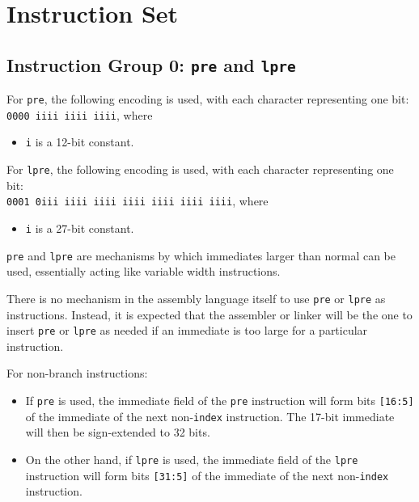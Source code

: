 \documentclass{article}
\begin{document}
	\newpage
	\section{Instruction Set}

	\subsection{Instruction Group 0: \texttt{pre} and \texttt{lpre}}
	For \texttt{pre}, the following encoding is used, with each character
	representing one bit: \\
	\texttt{0000 iiii iiii iiii}, where 
	
	\singlespacing
	\begin{itemize}
		\item \texttt{i} is a 12-bit constant.
	\end{itemize}

	For \texttt{lpre}, the following encoding is used, with each character
	representing one bit: \\
	\texttt{0001 0iii iiii iiii  iiii iiii iiii iiii}, where

	\singlespacing
	\begin{itemize}
		\item \texttt{i} is a 27-bit constant.
	\end{itemize}

	\texttt{pre} and \texttt{lpre} are mechanisms by which immediates
	larger than normal can be used, essentially acting like variable width
	instructions.

	There is no mechanism in the assembly language itself to use
	\texttt{pre} or \texttt{lpre} as instructions. Instead, it is expected
	that the assembler or linker will be the one to insert \texttt{pre} or
	\texttt{lpre} as needed if an immediate is too large for a particular
	instruction.

	For non-branch instructions:
	\begin{itemize}
		\item If \texttt{pre} is used, the immediate field of the
		\texttt{pre} instruction will form bits \texttt{[16:5]} of the
		immediate of the next non-\texttt{index} instruction. The 17-bit
		immediate will then be sign-extended to 32 bits.

		\item On the other hand, if \texttt{lpre} is used, the immediate
		field of the \texttt{lpre} instruction will form bits
		\texttt{[31:5]} of the immediate of the next non-\texttt{index}
		instruction.
	\end{itemize}
\end{document}
